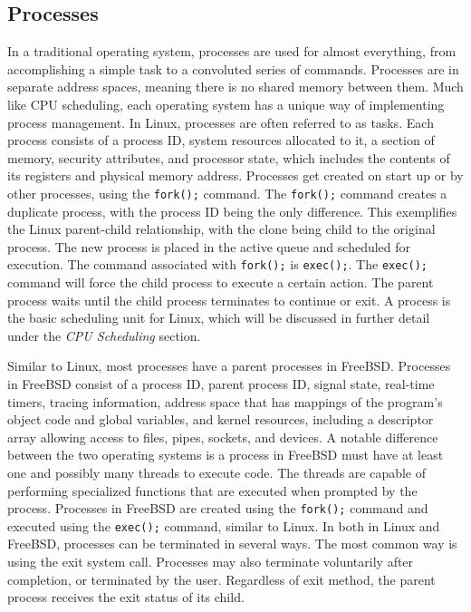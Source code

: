 \documentclass[10pt, onecolumn]{IEEEtran}
\begin{document}
    \subsection*{Processes}
        In a traditional operating system, processes are used for almost everything, from accomplishing a simple task to a convoluted series of commands. Processes are in separate address spaces, meaning there is no shared memory between them. Much like CPU scheduling, each operating system has a unique way of implementing process management. In Linux, processes are often referred to as tasks. Each process consists of a process ID, system resources allocated to it, a section of memory, security attributes, and processor state, which includes the contents of its registers and physical memory address. Processes get created on start up or by other processes, using the \texttt{fork();} command. The \texttt{fork();} command creates a duplicate process, with the process ID being the only difference. This exemplifies the Linux parent-child relationship, with the clone being child to the original process. The new process is placed in the active queue and scheduled for execution. The command associated with \texttt{fork();} is \texttt{exec();}. The \texttt{exec();} command will force the child process to execute a certain action. The parent process waits until the child process terminates to continue or exit. A process is the basic scheduling unit for Linux, which will be discussed in further detail under the \textit{CPU Scheduling} section. 
        
        \vspace{3mm}
        
        Similar to Linux, most processes have a parent processes in FreeBSD. Processes in FreeBSD consist of a process ID, parent process ID, signal state, real-time timers, tracing information, address space that has mappings of the program's object code and global variables, and kernel resources, including a descriptor array allowing access to files, pipes, sockets, and devices. A notable difference between the two operating systems is a process in FreeBSD must have at least one and possibly many threads to execute code. The threads are capable of performing specialized functions that are executed when prompted by the process. Processes in FreeBSD are created using the \texttt{fork();} command and executed using the \texttt{exec();} command, similar to Linux. In both in Linux and FreeBSD, processes can be terminated in several ways. The most common way is using the exit system call. Processes may also terminate voluntarily after completion, or terminated by the user. Regardless of exit method, the parent process receives the exit status of its child.
        
\end{document}
